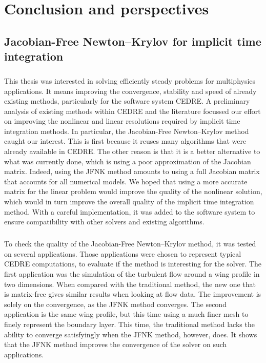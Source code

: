 \chapter*{Conclusion and perspectives}

  \section*{Jacobian-Free Newton--Krylov for implicit time integration}

    \paragraph{}
    This thesis was interested in solving efficiently steady problems for multiphysics applications.
    It means improving the convergence, stability and speed of already existing methods, particularly for the software system CEDRE.
    A preliminary analysis of existing methods within CEDRE and the literature focussed our effort on improving the nonlinear and linear resolutions required by implicit time integration methods.
    In particular, the Jacobian-Free Newton--Krylov method caught our interest.
    This is first because it reuses many algorithms that were already available in CEDRE.
    The other reason is that it is a better alternative to what was currently done, which is using a poor approximation of the Jacobian matrix.
    Indeed, using the JFNK method amounts to using a full Jacobian matrix that accounts for all numerical models.
    We hoped that using a more accurate matrix for the linear problem would improve the quality of the nonlinear solution, which would in turn improve the overall quality of the implicit time integration method.
    With a careful implementation, it was added to the software system to ensure compatibility with other solvers and existing algorithms.

    \paragraph{}
    To check the quality of the Jacobian-Free Newton--Krylov method, it was tested on several applications.
    Those applications were chosen to represent typical CEDRE computations, to evaluate if the method is interesting for the solver.
    The first application was the simulation of the turbulent flow around a wing profile in two dimensions.
    When compared with the traditional method, the new one that is matrix-free gives similar results when looking at flow data.
    The improvement is solely on the convergence, as the JFNK method converges.
    The second application is the same wing profile, but this time using a much finer mesh to finely represent the boundary layer.
    This time, the traditional method lacks the ability to converge satisfyingly when the JFNK method, however, does.
    It shows that the JFNK method improves the convergence of the solver on such applications.

